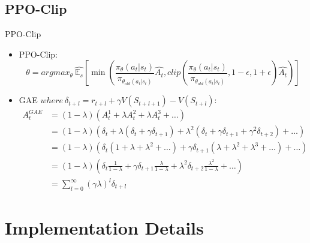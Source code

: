 \documentclass[english, xcolor=dvipsnames, aspectratio=169]{beamer}
\newcommand{\customToC}[2]
{
    \begin{frame}{Overview}
    \tableofcontents[#1,#2]
    \end{frame}
}
\begin{document}
\subsection{PPO-Clip}
\begin{frame}{PPO-Clip}
\begin{itemize}
    \item PPO-Clip:
    $$\theta=argmax_{\theta} \ \hat{\mathbb{E}_{s}}\left[\min\left(\frac{\pi_{\theta}(a_t|s_t)}{\pi_{\theta_{old}(a_t|s_t)}}\hat{A_t},clip\left(\frac{\pi_{\theta}(a_t|s_t)}{\pi_{\theta_{old}(a_t|s_t)}},1-\epsilon,1+\epsilon\right)\hat{A_t}\right)\right]
$$
\item GAE $where \ \delta_{t+l}=r_{t+l}+\gamma V(S_{t+l+1})-V(S_{t+l})$:
\begin{equation*}
    \begin{aligned}
            A_{t}^{GAE} &= (1-\lambda)(A_{t}^{1}+\lambda A_{t}^{2}+\lambda A_{t}^{3} + \dots)\\
               &= (1-\lambda)(\delta_t + \lambda(\delta_t+\gamma\delta_{t+1})+\lambda^2(\delta_t+\gamma\delta_{t+1}+\gamma^2\delta_{t+2})+\dots)\\
               &= (1-\lambda)(\delta_t(1+\lambda+\lambda^2+\dots)+\gamma\delta_{t+1}(\lambda+\lambda^2+\lambda^3+\dots)+\dots)\\
               &= (1-\lambda)\left(\delta_t\frac{1}{1-\lambda}+\gamma\delta_{t+1}\frac{\lambda}{1-\lambda}+\lambda^2\delta_{t+2}\frac{\lambda^2}{1-\lambda}+\dots\right)\\
               &= \sum_{l=0}^{\infty}(\gamma\lambda)^l\delta_{t+l} 
    \end{aligned}
\end{equation*}




    
\end{itemize}


\end{frame}










\section{Implementation Details}
\end{document}
